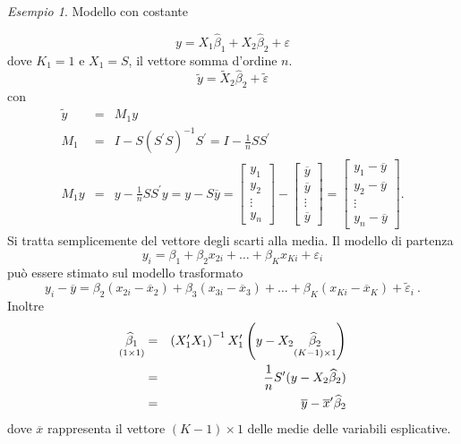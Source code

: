 \documentclass[a4paper]{report}
\newcounter{ese}
\theoremstyle{remark}
\newtheorem{esempio}[ese]{Esempio}
\newcounter{theor}
\begin{document}
\begin{esempio}
Modello con costante

\begin{equation*}
y=X_{1}\widehat{\beta }_{1}+X_{2}\widehat{\beta }_{2}+\varepsilon
\end{equation*}%
dove $K_{1}=1$ e $X_{1}=S$, il vettore somma d'ordine $n$.%
\begin{equation*}
\widetilde{y}=\widetilde{X}_{2}\widehat{\beta }_{2}+\widetilde{\varepsilon }
\end{equation*}%
con 
\begin{eqnarray*}
\widetilde{y} &=&M_{1}y \\
M_{1} &=&I-S(S^{\prime }S)^{-1}S^{\prime }=I-\frac{1}{n}SS^{\prime } \\
M_{1}y &=&y-\frac{1}{n}SS^{\prime }y=y-S\overline{y}=\left[ 
\begin{array}{c}
y_{1} \\ 
y_{2} \\ 
\vdots \\ 
y_{n}%
\end{array}%
\right] -\left[ 
\begin{array}{c}
\overline{y} \\ 
\overline{y} \\ 
\vdots \\ 
\overline{y}%
\end{array}%
\right] =\left[ 
\begin{array}{c}
y_{1}-\overline{y} \\ 
y_{2}-\overline{y} \\ 
\vdots \\ 
y_{n}-\overline{y}%
\end{array}%
\right] .
\end{eqnarray*}%
Si tratta semplicemente del vettore degli scarti alla media. Il modello di
partenza%
\begin{equation*}
y_{i}=\beta _{1}+\beta _{2}x_{2i}+\ldots +\beta _{K}x_{Ki}+\varepsilon _{i}
\end{equation*}%
pu\`{o} essere stimato sul modello trasformato%
\begin{equation*}
y_{i}-\overline{y}=\beta _{2}\left( x_{2i}-\overline{x}_{2}\right) +\beta
_{3}\left( x_{3i}-\overline{x}_{3}\right) +\ldots +\beta _{K}\left( x_{Ki}-%
\overline{x}_{K}\right) +\widetilde{\varepsilon }_{i}\ .
\end{equation*}%
Inoltre%
\begin{eqnarray*}
\underset{(1\times 1)}{\widehat{\beta }_{1}} &=&\left( X_{1}^{\prime
}X_{1}\right) ^{-1}X_{1}^{\prime }\left( y-X_{2}\underset{(K-1)\times 1}{%
\widehat{\beta }_{2}}\right) \\
&=&\frac{1}{n}S^{\prime }(y-X_{2}\widehat{\beta }_{2}) \\
&=&\overline{y}-\overline{x}^{\prime }\widehat{\beta }_{2}
\end{eqnarray*}%
dove $\overline{x}$ rappresenta il vettore $(K-1)\times 1$ delle medie delle
variabili esplicative.
\end{esempio}
\end{document}
